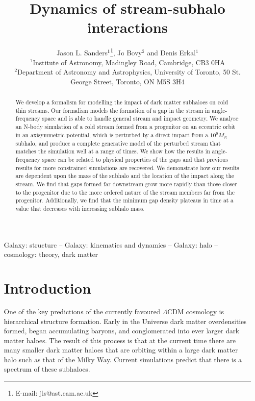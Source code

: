 \documentclass[useAMS,usenatbib,fleqn,a4paper]{mn2e}
\title{Dynamics of stream-subhalo interactions}
\author[J. L. Sanders, J. Bovy and D. Erkal]{Jason L. Sanders$^1$\thanks{E-mail: jls@ast.cam.ac.uk}, Jo Bovy$^2$ and Denis Erkal$^1$\\
$^1$Institute of Astronomy, Madingley Road, Cambridge, CB3 0HA\\
$^2$Department of Astronomy and Astrophysics, University of Toronto, 50 St. George Street, Toronto, ON M5S 3H4}
\begin{document}
\maketitle
\label{firstpage}
\begin{abstract}
We develop a formalism for modelling the impact of dark matter subhaloes on cold thin streams. Our formalism models the formation of a gap in the stream in angle-frequency space and is able to handle general stream and impact geometry. We analyse an N-body simulation of a cold stream formed from a progenitor on an eccentric orbit in an axisymmetric potential, which is perturbed by a direct impact from a $10^8 M_\odot$ subhalo, and produce a complete generative model of the perturbed stream that matches the simulation well at a range of times. We show how the results in angle-frequency space can be related to physical properties of the gaps and that previous results for more constrained simulations are recovered. We demonstrate how our results are dependent upon the mass of the subhalo and the location of the impact along the stream. We find that gaps formed far downstream grow more rapidly than those closer to the progenitor due to the more ordered nature of the stream members far from the progenitor. Additionally, we find that the minimum gap density plateaus in time at a value that decreases with increasing subhalo mass.
\end{abstract}

\begin{keywords}
Galaxy: structure -- Galaxy: kinematics and dynamics -- Galaxy: halo -- cosmology: theory, dark matter
\end{keywords}

\section{Introduction}

One of the key predictions of the currently favoured $\Lambda$CDM cosmology is hierarchical structure formation. Early in the Universe dark matter overdensities formed, began accumulating baryons, and conglomerated into ever larger dark matter haloes. The result of this process is that at the current time there are many smaller dark matter haloes that are orbiting within a large dark matter halo such as that of the Milky Way. Current simulations \citep[e.g.][]{Diemand2008,Springel2008} predict that there is a spectrum of these subhaloes.
\end{document}
